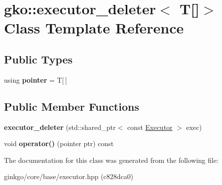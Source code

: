 \hypertarget{classgko_1_1executor__deleter_3_01T[]_4}{}\section{gko\+:\+:executor\+\_\+deleter$<$ T\mbox{[}\mbox{]}$>$ Class Template Reference}
\label{classgko_1_1executor__deleter_3_01T[]_4}
\subsection*{Public Types}
\begin{DoxyCompactItemize}
\item 
\mbox{\label{classgko_1_1executor__deleter_3_01T[]_4_ad28bfaa2f1d909bc11117a4889581a02}} 
using {\bfseries pointer} = T\mbox{[}$\,$\mbox{]}
\end{DoxyCompactItemize}
\subsection*{Public Member Functions}
\begin{DoxyCompactItemize}
\item 
\mbox{\label{classgko_1_1executor__deleter_3_01T[]_4_ab60279758e90bdcd14b076c55813d5be}} 
{\bfseries executor\+\_\+deleter} (std\+::shared\+\_\+ptr$<$ const \hyperlink{classgko_1_1Executor}{Executor} $>$ exec)
\item 
\mbox{\label{classgko_1_1executor__deleter_3_01T[]_4_a83f935eea2ed81964c8a018964c96934}} 
void {\bfseries operator()} (pointer ptr) const
\end{DoxyCompactItemize}


The documentation for this class was generated from the following file\+:\begin{DoxyCompactItemize}
\item 
ginkgo/core/base/executor.\+hpp (c828dca0)\end{DoxyCompactItemize}
